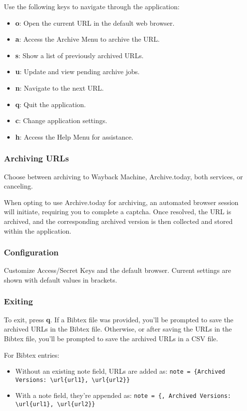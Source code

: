 Use the following keys to navigate through the application:

\begin{itemize}
	\item \textbf{o}: Open the current URL in the default web browser.
	\item \textbf{a}: Access the Archive Menu to archive the URL.
	\item \textbf{s}: Show a list of previously archived URLs.
	\item \textbf{u}: Update and view pending archive jobs.
	\item \textbf{n}: Navigate to the next URL.
	\item \textbf{q}: Quit the application.
	\item \textbf{c}: Change application settings.
	\item \textbf{h}: Access the Help Menu for assistance.
\end{itemize}

\subsubsection{Archiving URLs}

Choose between archiving to Wayback Machine, Archive.today, both services, or canceling.

When opting to use Archive.today for archiving, an automated browser session will initiate, requiring you to complete a captcha. Once resolved, the URL is archived, and the corresponding archived version is then collected and stored within the application.

\subsubsection{Configuration}

Customize Access/Secret Keys and the default browser. Current settings are shown with default values in brackets.

\subsubsection{Exiting}

To exit, press \textbf{q}. If a Bibtex file was provided, you'll be prompted to save the archived URLs in the Bibtex file. Otherwise, or after saving the URLs in the Bibtex file, you'll be prompted to save the archived URLs in a CSV file.

For Bibtex entries:
\begin{itemize}
	\item Without an existing note field, URLs are added as: \texttt{note = \{Archived Versions: \textbackslash url\{url1\}, \textbackslash url\{url2\}\}}
	\item With a note field, they're appended as: \texttt{note = \{<current note>, Archived Versions: \textbackslash url\{url1\}, \textbackslash url\{url2\}\}}
\end{itemize}
